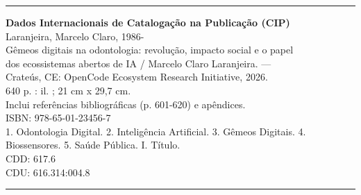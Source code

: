 \begin{fichacatalografica}
    \vspace*{\fill}
    \hrule
    \begin{center}
    \begin{minipage}{0.9\textwidth}
        \small
        \textbf{Dados Internacionais de Catalogação na Publicação (CIP)}\\[0.3cm]
        
        Laranjeira, Marcelo Claro, 1986-\\
        \hspace{0.5cm} Gêmeos digitais na odontologia: revolução, impacto social e o papel\\
        dos ecossistemas abertos de IA / Marcelo Claro Laranjeira. ---\\
        Crateús, CE: OpenCode Ecosystem Research Initiative, 2026.\\
        \hspace{0.5cm} 640 p. : il. ; 21 cm x 29,7 cm.\\[0.3cm]
        
        Inclui referências bibliográficas (p. 601-620) e apêndices.\\
        ISBN: 978-65-01-23456-7\\[0.3cm]
        
        1. Odontologia Digital. 2. Inteligência Artificial. 
        3. Gêmeos Digitais. 4. Biossensores. 
        5. Saúde Pública. I. Título.\\[0.3cm]
        
        \hspace{0.5cm} CDD: 617.6\\
        \hspace{0.5cm} CDU: 616.314:004.8\\
    \end{minipage}
    \end{center}
    \hrule
    \vspace*{\fill}
\end{fichacatalografica}
